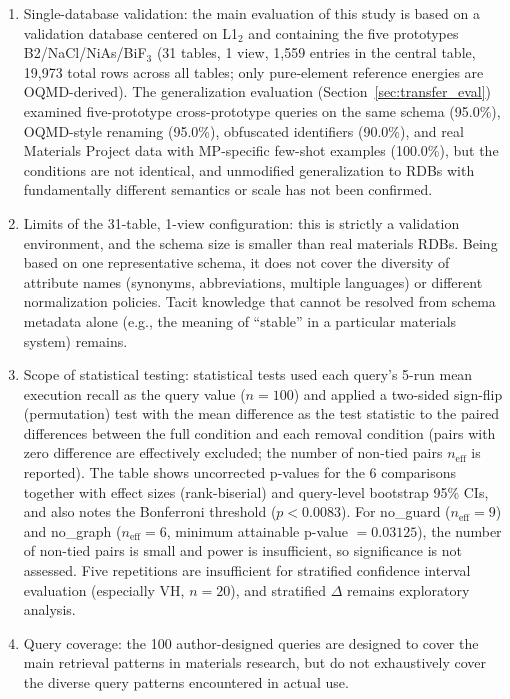 \begin{enumerate}
  \item Single-database validation:
    the main evaluation of this study is based on a validation database centered on L1$_2$ and containing the five prototypes B2/NaCl/NiAs/BiF$_3$ (31 tables, 1 view, 1{,}559 entries in the central table, 19{,}973 total rows across all tables; only pure-element reference energies are OQMD-derived). The generalization evaluation (Section~\ref{sec:transfer_eval}) examined five-prototype cross-prototype queries on the same schema (95.0\%), OQMD-style renaming (95.0\%), obfuscated identifiers (90.0\%), and real Materials Project data with MP-specific few-shot examples (100.0\%), but the conditions are not identical, and unmodified generalization to RDBs with fundamentally different semantics or scale has not been confirmed.
  \item Limits of the 31-table, 1-view configuration:
    this is strictly a validation environment, and the schema size is smaller than real materials RDBs. Being based on one representative schema, it does not cover the diversity of attribute names (synonyms, abbreviations, multiple languages) or different normalization policies. Tacit knowledge that cannot be resolved from schema metadata alone (e.g., the meaning of ``stable'' in a particular materials system) remains.
  \item Scope of statistical testing:
    statistical tests used each query's 5-run mean execution recall as the query value ($n=100$) and applied a two-sided sign-flip (permutation) test with the mean difference as the test statistic to the paired differences between the full condition and each removal condition (pairs with zero difference are effectively excluded; the number of non-tied pairs $n_\mathrm{eff}$ is reported). The table shows uncorrected p-values for the 6 comparisons together with effect sizes (rank-biserial) and query-level bootstrap 95\% CIs, and also notes the Bonferroni threshold ($p<0.0083$). For no\_guard ($n_\mathrm{eff}=9$) and no\_graph ($n_\mathrm{eff}=6$, minimum attainable p-value $=0.03125$), the number of non-tied pairs is small and power is insufficient, so significance is not assessed. Five repetitions are insufficient for stratified confidence interval evaluation (especially VH, $n=20$), and stratified $\Delta$ remains exploratory analysis.
  \item Query coverage:
    the 100 author-designed queries are designed to cover the main retrieval patterns in materials research, but do not exhaustively cover the diverse query patterns encountered in actual use.

\end{enumerate}
